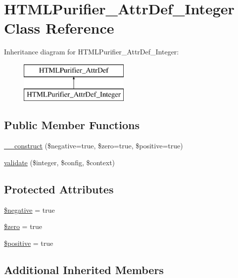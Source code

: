\hypertarget{classHTMLPurifier__AttrDef__Integer}{\section{H\+T\+M\+L\+Purifier\+\_\+\+Attr\+Def\+\_\+\+Integer Class Reference}
\label{classHTMLPurifier__AttrDef__Integer}
}
Inheritance diagram for H\+T\+M\+L\+Purifier\+\_\+\+Attr\+Def\+\_\+\+Integer\+:\begin{figure}[H]
\begin{center}
\leavevmode
\includegraphics[height=2.000000cm]{classHTMLPurifier__AttrDef__Integer}
\end{center}
\end{figure}
\subsection*{Public Member Functions}
\begin{DoxyCompactItemize}
\item 
\hyperlink{classHTMLPurifier__AttrDef__Integer_a71830661a14e316cdb6415208eaa092d}{\+\_\+\+\_\+construct} (\$negative=true, \$zero=true, \$positive=true)
\item 
\hyperlink{classHTMLPurifier__AttrDef__Integer_af59cbb87c7f5cc92e79f9e4ebcfb1f46}{validate} (\$integer, \$config, \$context)
\end{DoxyCompactItemize}
\subsection*{Protected Attributes}
\begin{DoxyCompactItemize}
\item 
\hyperlink{classHTMLPurifier__AttrDef__Integer_a760f67c20ecd2d873c1e76eb5a8a2463}{\$negative} = true
\item 
\hyperlink{classHTMLPurifier__AttrDef__Integer_ae3b61a5ba24479d2104accc5eb11b3c5}{\$zero} = true
\item 
\hyperlink{classHTMLPurifier__AttrDef__Integer_a43924be8ea747daf7d9f25403827db79}{\$positive} = true
\end{DoxyCompactItemize}
\subsection*{Additional Inherited Members}


